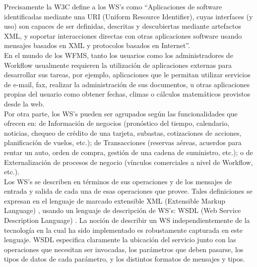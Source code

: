 Precisamente la W3C define a los WS's como ``Aplicaciones de software identificadas mediante una URI (Uniform Resource Identifier), cuyas interfaces (y uso) son capaces de ser definidas, descritas y descubiertas mediante artefactos XML, y soportar interacciones directas con otras aplicaciones software usando mensajes basados en XML y protocolos basados en Internet''.\\

En el mundo de los WFMS, tanto los usuarios como los administradores de Workflow usualmente requieren la utilización de aplicaciones externas para desarrollar sus tareas, por ejemplo, aplicaciones que le permitan utilizar servicios de e-mail, fax, realizar la administración de sus documentos, u otras aplicaciones propias del usuario como obtener fechas, climas o cálculos matemáticos provistos desde la web.\\

Por otra parte, los WS's pueden ser agrupados según las funcionalidades que ofrecen en: de Información de negocios (pronóstico del tiempo, calendario, noticias, chequeo de crédito de una tarjeta, subastas, cotizaciones de acciones, planificación de vuelos, etc.); de Transacciones (reservas aéreas, acuerdos para rentar un auto, orden de compra, gestión de una cadena de suministro, etc.); o de Externalización de procesos de negocio (vínculos comerciales a nivel de Workflow, etc.).\\

Los WS's se describen en términos de sus operaciones y de los mensajes de entrada y salida de cada una de esas operaciones que provee. Tales definiciones se expresan en el lenguaje de marcado extensible XML (Extensible Markup Language) \cite{XML}, usando un lenguaje de descripción de WS's: WSDL (Web Service Description Language)\cite{WSDL2.0-0} \cite{WSDL2.0-1}. La noción de describir un WS independientemente de la tecnología en la cual ha sido implementado es robustamente capturada en este lenguaje. WSDL especifica claramente la ubicación del servicio junto con las operaciones que necesitan ser invocadas, los parámetros que deben pasarse, los tipos de datos de cada parámetro, y los distintos formatos de mensajes y tipos.\\ 

